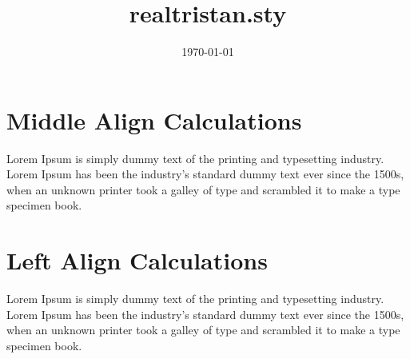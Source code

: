 \documentclass{article}
\title{realtristan.sty}
\author{\email{heytristaann@gmail.com}}
\date{\today}
\begin{document}
\maketitle

\section{Middle Align Calculations} {
  Lorem Ipsum is simply dummy text of the printing and typesetting industry. Lorem Ipsum has been the industry's standard dummy text ever since the 1500s, when an unknown printer took a galley of type and scrambled it to make a type specimen book.
  \malign*{
    \therefore \kina{}
  }
 }
 
\section{Left Align Calculations} {
  Lorem Ipsum is simply dummy text of the printing and typesetting industry. Lorem Ipsum has been the industry's standard dummy text ever since the 1500s, when an unknown printer took a galley of type and scrambled it to make a type specimen book.
  \lalign{
      \therefore \kinb{}
  }
 }
\end{document}
